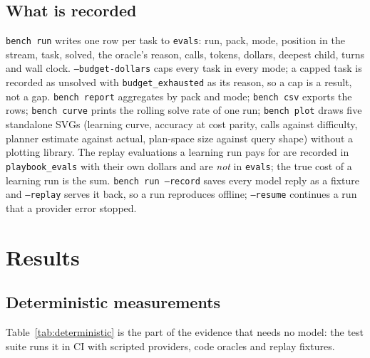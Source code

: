 \documentclass[11pt,a4paper]{article}
\newcommand{\code}[1]{\texttt{#1}}
\begin{document}
\subsection{What is recorded}

\code{bench run} writes one row per task to \code{evals}: run, pack, mode,
position in the stream, task, solved, the oracle's reason, calls, tokens,
dollars, deepest child, turns and wall clock. \code{--budget-dollars} caps
every task in every mode; a capped task is recorded as unsolved with
\code{budget\_exhausted} as its reason, so a cap is a result, not a gap. \code{bench report} aggregates by
pack and mode; \code{bench csv} exports the rows; \code{bench curve} prints the
rolling solve rate of one run; \code{bench plot} draws five standalone SVGs
(learning curve, accuracy at cost parity, calls against difficulty, planner
estimate against actual, plan-space size against query shape) without a
plotting library. The replay evaluations a learning run pays for are recorded
in \code{playbook\_evals} with their own dollars and are \emph{not} in
\code{evals}; the true cost of a learning run is the sum. \code{bench run
--record} saves every model reply as a fixture and \code{--replay} serves it
back, so a run reproduces offline; \code{--resume} continues a run that a
provider error stopped.

\section{Results}
\label{sec:results}

\FloatBarrier
\subsection{Deterministic measurements}
\label{sec:deterministic}

Table~\ref{tab:deterministic} is the part of the evidence that needs no model:
the test suite runs it in CI with scripted providers, code oracles and replay
fixtures.
\end{document}
